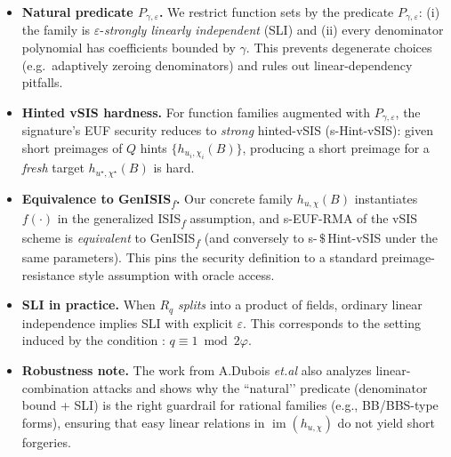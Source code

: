 \begin{itemize}
  \item \textbf{Natural predicate $P_{\gamma,\varepsilon}$.} We restrict function sets by the predicate
  $P_{\gamma,\varepsilon}$: (i) the family is $\varepsilon$-\emph{strongly linearly independent} (SLI) and (ii) every denominator polynomial has coefficients bounded by $\gamma$. This prevents degenerate
  choices (e.g.\ adaptively zeroing denominators) and rules out linear-dependency pitfalls. \cite[Defs~6-7]{cryptoeprint:2025/356}

  \item \textbf{Hinted vSIS hardness.} For function families augmented with $P_{\gamma,\varepsilon}$, the signature’s
  EUF security reduces to \emph{strong} hinted-vSIS (s-Hint-vSIS): given short preimages of $Q$ hints
  $\{h_{u_i,\chi_i}(B)\}$, producing a short preimage for a \emph{fresh} target $h_{u^\star,\chi^\star}(B)$ is hard. \cite[§3.1]{cryptoeprint:2025/356}

  \item \textbf{Equivalence to GenISIS\textsubscript{$f$}.} Our concrete family $h_{u,\chi}(B)$ instantiates $f(\cdot)$ in the
  generalized ISIS\textsubscript{$f$} assumption, and s-EUF-RMA of the vSIS scheme is \emph{equivalent} to GenISIS\textsubscript{$f$}
  (and conversely to s-$\,\$\,$Hint-vSIS under the same parameters). This pins the security definition to a standard
  preimage-resistance style assumption with oracle access. \cite[Thm~7-8]{cryptoeprint:2025/356}

  \item \textbf{SLI in practice.} When $R_q$ \emph{splits} into a product of fields, ordinary
  linear independence implies SLI with explicit $\varepsilon$. This corresponds to the setting induced by
  the condition : $q\equiv 1\bmod 2\varphi$. 

  \item \textbf{Robustness note.} The work from A.Dubois \emph{et.al} also analyzes linear-combination attacks and shows why the “natural’’
  predicate (denominator bound + SLI) is the right guardrail for rational families (e.g., BB/BBS-type forms),
  ensuring that easy linear relations in $\operatorname{im}(h_{u,\chi})$ do not yield short forgeries. 
  
  
\end{itemize}


